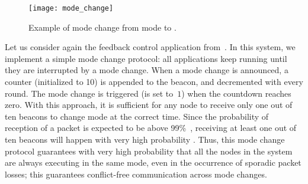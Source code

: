 \begin{figure}
	\centering
	\texttt{[image: mode\_change]}%
	\caption{%
	Example of mode change from mode  to .
}
\label{fig:mode_change}
\end{figure}

\begin{example}
	Let us consider again the feedback control application from~\cite{mager2019Demo}.
	In this system, we implement a simple mode change protocol: all applications keep running until they are interrupted by a mode change.
%
	When a mode change is announced, a counter (initialized to 10) is appended to the beacon, and decremented with every round.
	The mode change is triggered (\ie \TB is set to~$1$) when the countdown reaches zero.
%
	With this approach, it is sufficient for any node to receive only one out of ten beacons to change mode at the correct time.
	Since the probability of reception of a packet is expected to be above 99\%~\cite{ferrari2011Glossy},
	receiving at least one out of ten beacons will happen with very high probability .
	Thus, this mode change protocol guarantees with very high probability that all the nodes in the system are always executing in the same mode, even in the occurrence of sporadic packet losses; this guarantees conflict-free communication across mode changes.
\end{example}
